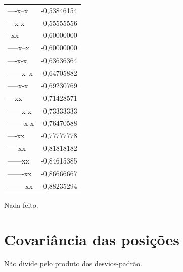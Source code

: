 \documentclass[
  letterpaper,
  DIV=11,
  numbers=noendperiod]{scrreprt}
\begin{document}
\begin{longtable*}{lr}
----x--x & -0,53846154 \\ 
---x-x & -0,55555556 \\ 
--xx & -0,60000000 \\ 
-----x--x & -0,60000000 \\ 
----x-x & -0,63636364 \\ 
------x--x & -0,64705882 \\ 
-----x-x & -0,69230769 \\ 
---xx & -0,71428571 \\ 
------x-x & -0,73333333 \\ 
-------x-x & -0,76470588 \\ 
----xx & -0,77777778 \\ 
-----xx & -0,81818182 \\ 
------xx & -0,84615385 \\ 
-------xx & -0,86666667 \\ 
--------xx & -0,88235294 \\ 
\bottomrule
\end{longtable*}

Nada feito.

\section{Covariância das
posições}\label{covariuxe2ncia-das-posiuxe7uxf5es}

Não divide pelo produto dos desvios-padrão.
\end{document}
